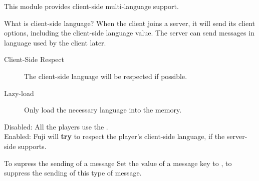 \label{sec:language}
This module provides client-side multi-language support.


\begin{note}{What is client-side language?}
    When the client joins a server, it will send its client options, including the client-side language value.
    The server can send messages in language used by the client later.
\end{note}


\begin{description}
    \item[Client-Side Respect] The client-side language will be respected if possible.
    \item[Lazy-load] Only load the necessary language into the memory.
\end{description}


Disabled: All the players use the .\\
Enabled: Fuji will \textbf{try} to respect the player's client-side language, if the server-side supports.

\begin{example}{To supress the sending of a message}
    Set the value of a message key to , to suppress the sending of this type of message.
\end{example}
